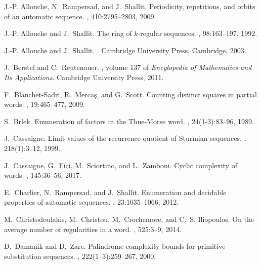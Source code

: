 \documentclass[11pt,reqno]{amsart}
\numberwithin{equation}{section}
\theoremstyle{plain}
\theoremstyle{definition}
\theoremstyle{remark}
\begin{document}
\newcommand{\noopsort}[1]{} \newcommand{\singleletter}[1]{#1}
\begin{thebibliography}{10}

J.-P. Allouche, N.~Rampersad, and J.~Shallit.
\newblock Periodicity, repetitions, and orbits of an automatic sequence.
, 410:2795--2803, 2009.

J.-P. Allouche and J.~Shallit.
\newblock The ring of $k$-regular sequences.
, 98:163--197, 1992.

J.-P. Allouche and J.~Shallit.
.
\newblock Cambridge University Press, Cambridge, 2003.

J.~Berstel and C.~Reutenauer.
, volume 137 of
  {\em Encylopedia of Mathematics and Its Applications}.
\newblock Cambridge University Press, 2011.

F.~Blanchet-Sadri, R.~{Merca\c{s}}, and G.~Scott.
\newblock Counting distinct squares in partial words.
, 19:465--477, 2009.

S.~Brlek.
\newblock Enumeration of factors in the {T}hue-{M}orse word.
, 24(1-3):83--96, 1989.

J.~Cassaigne.
\newblock Limit values of the recurrence quotient of {Sturmian} sequences.
, 218(1):3--12, 1999.

J.~Cassaigne, G.~Fici, M.~Sciortino, and L.~Zamboni.
\newblock Cyclic complexity of words.
, 145:36--56, 2017.

E.~Charlier, N.~Rampersad, and J.~Shallit.
\newblock Enumeration and decidable properties of automatic sequences.
, 23:1035--1066, 2012.

M.~Christodoulakis, M.~Christou, M.~Crochemore, and C.~S. Iliopoulos.
\newblock On the average number of regularities in a word.
, 525:3--9, 2014.

D.~Damanik and D.~Zare.
\newblock Palindrome complexity bounds for primitive substitution sequences.
, 222(1--3):259--267, 2000.


\end{thebibliography}
\end{document}
